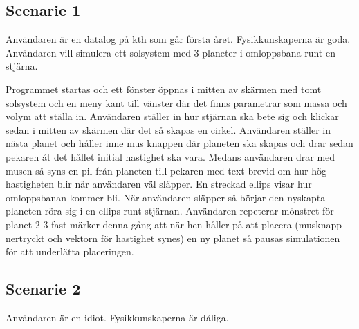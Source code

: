 \subsection{Scenarie 1}
Användaren är en datalog på kth som går första året.
Fysikkunskaperna är goda. Användaren vill simulera ett solsystem med 3 planeter i omloppsbana runt en stjärna.

Programmet startas och ett fönster öppnas i mitten av skärmen med tomt solsystem och en meny kant till
vänster där det finns parametrar som massa och volym att ställa in.
Användaren ställer in hur stjärnan ska bete sig och klickar
sedan i mitten av skärmen där det så skapas en cirkel.
Användaren ställer in nästa planet och håller inne mus knappen där
planeten ska skapas och drar sedan pekaren åt det hållet initial
hastighet ska vara.
Medans användaren drar med musen så syns en pil från planeten till
pekaren med text brevid om hur hög hastigheten blir när användaren väl släpper.
En streckad ellips visar hur omloppsbanan kommer bli.
När användaren släpper så börjar den nyskapta planeten röra sig
i en ellips runt stjärnan.
Användaren repeterar mönstret för planet 2-3 fast märker denna gång
att när hen håller på att placera (musknapp nertryckt och vektorn
för hastighet synes) en ny planet så pausas simulationen för att
underlätta placeringen.


\subsection{Scenarie 2}
Användaren är en idiot.
Fysikkunskaperna är dåliga.

